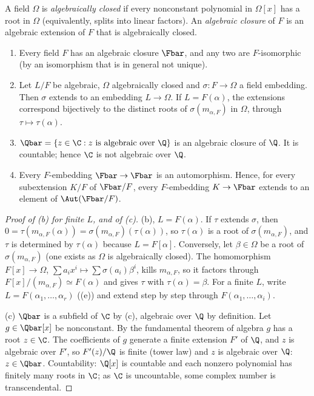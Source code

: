 \begin{theorem}\label{thm:galois:algebraic-closure}
A field $\Omega$ is \emph{algebraically closed} if every nonconstant polynomial in $\Omega[x]$ has a root in $\Omega$ (equivalently, splits into linear
factors). An \emph{algebraic closure} of $F$ is an algebraic extension of $F$ that is algebraically closed.
\begin{enumerate}[label=(\alph*)]
\item Every field $F$ has an algebraic closure $\Fbar$, and any two are $F$-isomorphic (by an isomorphism that is in general not unique).
\item Let $L/F$ be algebraic, $\Omega$ algebraically closed and $\sigma\colon F\to\Omega$ a field embedding. Then $\sigma$ extends to an embedding
$L\to\Omega$. If $L=F(\alpha)$, the extensions correspond bijectively to the distinct roots of $\sigma(m_{\alpha,F})$ in $\Omega$, through $\tau\mapsto\tau(\alpha)$.
\item $\Qbar=\{z\in\C:z\text{ is algebraic over }\Q\}$ is an algebraic closure of $\Q$. It is countable; hence $\C$ is not algebraic over $\Q$.
\item Every $F$-embedding $\Fbar\to\Fbar$ is an automorphism. Hence, for every subextension $K/F$ of $\Fbar/F$, every $F$-embedding $K\to\Fbar$ extends to an
element of $\Aut(\Fbar/F)$.
\end{enumerate}
\end{theorem}

\begin{proof}[Proof of (b) for finite $L$, and of (c)]
(b), $L=F(\alpha)$. If $\tau$ extends $\sigma$, then $0=\tau(m_{\alpha,F}(\alpha))=\sigma(m_{\alpha,F})(\tau(\alpha))$, so $\tau(\alpha)$ is a root of
$\sigma(m_{\alpha,F})$, and $\tau$ is determined by $\tau(\alpha)$ because $L=F[\alpha]$. Conversely, let $\beta\in\Omega$ be a root of
$\sigma(m_{\alpha,F})$ (one exists as $\Omega$ is algebraically closed). The homomorphism $F[x]\to\Omega$, $\sum a_ix^i\mapsto\sum\sigma(a_i)\beta^i$, kills
$m_{\alpha,F}$, so it factors through $F[x]/(m_{\alpha,F})\simeq F(\alpha)$ and gives $\tau$ with $\tau(\alpha)=\beta$. For a finite $L$, write
$L=F(\alpha_1,\dots,\alpha_r)$ ((e)) and extend step by step through $F(\alpha_1,\dots,\alpha_i)$.

(c) $\Qbar$ is a subfield of $\C$ by (c), algebraic over $\Q$ by definition. Let $g\in\Qbar[x]$ be nonconstant. By the
fundamental theorem of algebra $g$ has a root $z\in\C$. The coefficients of $g$ generate a finite extension $F'$ of $\Q$, and $z$ is algebraic over $F'$, so
$F'(z)/\Q$ is finite (tower law) and $z$ is algebraic over $\Q$: $z\in\Qbar$. Countability: $\Q[x]$ is countable and each nonzero polynomial has finitely many
roots in $\C$; as $\C$ is uncountable, some complex number is transcendental.
\end{proof}

